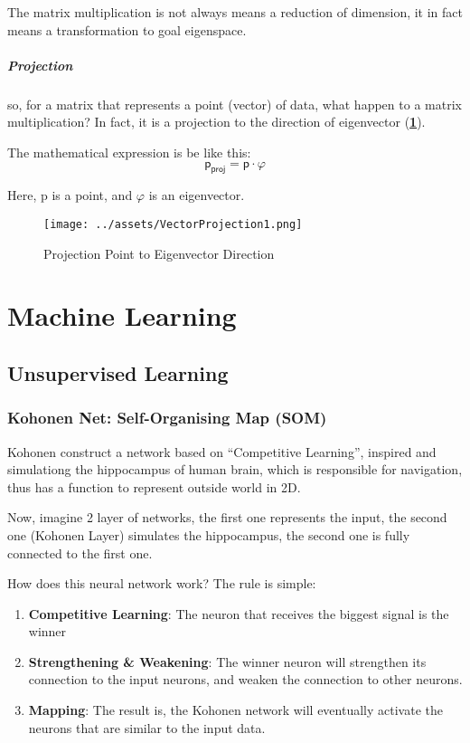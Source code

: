 \documentclass[a4paper, openany]{book}
\begin{document}
The matrix multiplication is not always means a reduction of dimension, it in fact means a transformation to goal eigenspace.

\paragraph{Projection}

so, for a matrix that represents a point (vector) of data, what happen to a matrix multiplication? In fact, it is a projection to the direction of eigenvector (\textbf{\cref{fig:VectorProjection1}}).

The mathematical expression is be like this:
$$\mathsf{p_{proj}} = \mathsf{p} \cdot \mathsf{\varphi }$$

Here, p is a point, and $\varphi$ is an eigenvector.

\begin{figure}[htbp]
  \centering
  \texttt{[image: ../assets/VectorProjection1.png]}
  \caption{Projection Point to Eigenvector Direction}
  \label{fig:VectorProjection1}
\end{figure}

\chapter{Machine Learning}

\section{Unsupervised Learning}

\subsection{Kohonen Net: Self-Organising Map (SOM)}

Kohonen construct a network based on ``Competitive Learning'', inspired and simulationg the hippocampus of human brain, which is responsible for navigation, thus has a function to represent outside world in 2D.

Now, imagine 2 layer of networks, the first one represents the input, the second one (Kohonen Layer) simulates the hippocampus, the second one is fully connected to the first one.

How does this neural network work? The rule is simple:

\begin{enumerate}
  \item \textbf{Competitive Learning}: The neuron that receives the biggest signal is the winner
  \item \textbf{Strengthening \& Weakening}: The winner neuron will strengthen its connection to the input neurons, and weaken the connection to other neurons.
  \item \textbf{Mapping}: The result is, the Kohonen network will eventually activate the neurons that are similar to the input data.
\end{enumerate}
\end{document}

